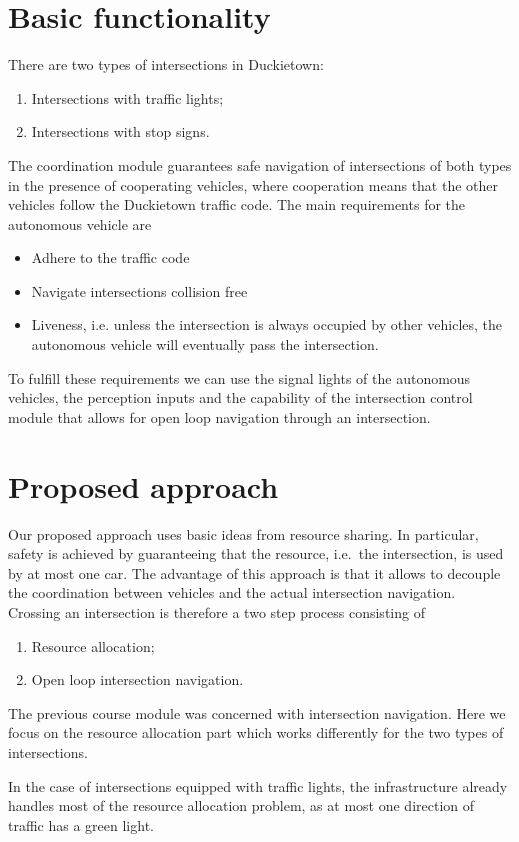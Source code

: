 \documentclass[11pt]{article}
\theoremstyle{definition}
\begin{document}
\section{Basic functionality}
%
There are two types of intersections in Duckietown:
\begin{enumerate}
\item Intersections with traffic lights;
\item Intersections with stop signs.
\end{enumerate}
The coordination module guarantees safe navigation of intersections of both types in the presence of cooperating vehicles, where cooperation means that the other vehicles follow the Duckietown traffic code. The main requirements for the autonomous vehicle are
\begin{itemize}
\item Adhere to the traffic code
\item Navigate intersections collision free
\item Liveness, i.e. unless the intersection is always occupied by other vehicles, the autonomous vehicle will eventually pass the intersection.
\end{itemize}
%
To fulfill these requirements we can use the signal lights of the autonomous vehicles, the perception inputs and the capability of the intersection control module that allows for open loop navigation through an intersection.
%
%
%
\section{Proposed approach}
%
Our proposed approach uses basic ideas from resource sharing. In particular, safety is achieved by guaranteeing that the resource, i.e.\ the intersection, is used by at most one car. The advantage of this approach is that it allows to decouple the coordination between vehicles and the actual intersection navigation. Crossing an intersection is therefore a two step process consisting of
\begin{enumerate}
\item Resource allocation;
\item Open loop intersection navigation.
\end{enumerate}

The previous course module was concerned with intersection navigation. Here we focus on the resource allocation part which works differently for the two types of intersections.

In the case of intersections equipped with traffic lights, the infrastructure already handles most of the resource allocation problem, as at most one direction of traffic has a green light.
\end{document}
